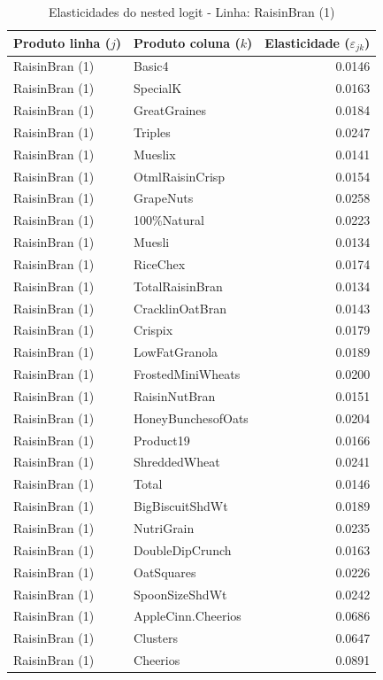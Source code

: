 \begingroup
\begin{table}[H]
\centering
\caption{Elasticidades do nested logit - Linha: RaisinBran (1)}
\label{tab:elas-nested-raisinbran-1}
\small
\begin{tabular}{llr}
\toprule
Produto linha ($j$) & Produto coluna ($k$) & Elasticidade ($\varepsilon_{jk}$) \\
\midrule
RaisinBran (1) & Basic4 & 0.0146 \\
RaisinBran (1) & SpecialK & 0.0163 \\
RaisinBran (1) & GreatGraines & 0.0184 \\
RaisinBran (1) & Triples & 0.0247 \\
RaisinBran (1) & Mueslix & 0.0141 \\
RaisinBran (1) & OtmlRaisinCrisp & 0.0154 \\
RaisinBran (1) & GrapeNuts & 0.0258 \\
RaisinBran (1) & 100\%Natural & 0.0223 \\
RaisinBran (1) & Muesli & 0.0134 \\
RaisinBran (1) & RiceChex & 0.0174 \\
RaisinBran (1) & TotalRaisinBran & 0.0134 \\
RaisinBran (1) & CracklinOatBran & 0.0143 \\
RaisinBran (1) & Crispix & 0.0179 \\
RaisinBran (1) & LowFatGranola & 0.0189 \\
RaisinBran (1) & FrostedMiniWheats & 0.0200 \\
RaisinBran (1) & RaisinNutBran & 0.0151 \\
RaisinBran (1) & HoneyBunchesofOats & 0.0204 \\
RaisinBran (1) & Product19 & 0.0166 \\
RaisinBran (1) & ShreddedWheat & 0.0241 \\
RaisinBran (1) & Total & 0.0146 \\
RaisinBran (1) & BigBiscuitShdWt & 0.0189 \\
RaisinBran (1) & NutriGrain & 0.0235 \\
RaisinBran (1) & DoubleDipCrunch & 0.0163 \\
RaisinBran (1) & OatSquares & 0.0226 \\
RaisinBran (1) & SpoonSizeShdWt & 0.0242 \\
RaisinBran (1) & AppleCinn.Cheerios & 0.0686 \\
RaisinBran (1) & Clusters & 0.0647 \\
RaisinBran (1) & Cheerios & 0.0891 \\

\end{tabular}
\end{table}

